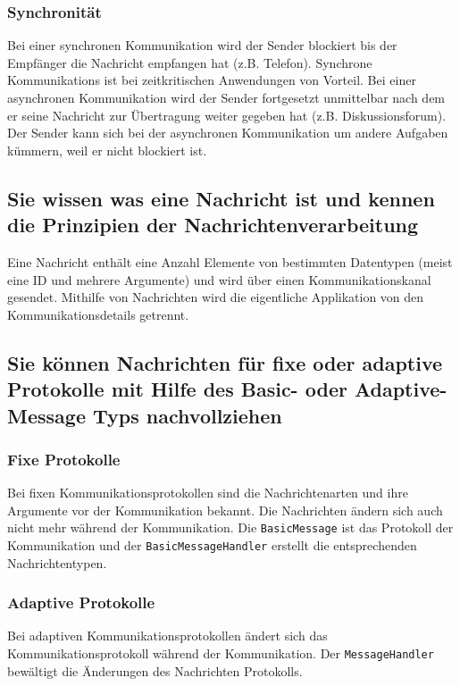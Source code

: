 \subsubsection{Synchronität}

Bei einer synchronen Kommunikation wird der Sender blockiert bis der Empfänger die Nachricht empfangen hat (z.B. Telefon). Synchrone Kommunikations ist bei zeitkritischen Anwendungen von Vorteil. Bei einer asynchronen Kommunikation wird der Sender fortgesetzt unmittelbar nach dem er seine Nachricht zur Übertragung weiter gegeben hat (z.B. Diskussionsforum). Der Sender kann sich bei der asynchronen Kommunikation um andere Aufgaben kümmern, weil er nicht blockiert ist.

\subsection{Sie wissen was eine Nachricht ist und kennen die Prinzipien der Nachrichtenverarbeitung}

Eine Nachricht enthält eine Anzahl Elemente von bestimmten Datentypen (meist eine ID und mehrere Argumente) und wird über einen Kommunikationskanal gesendet. Mithilfe von Nachrichten wird die eigentliche Applikation von den Kommunikationsdetails getrennt.

\subsection{Sie können Nachrichten für fixe oder adaptive Protokolle mit Hilfe des Basic- oder Adaptive-Message Typs nachvollziehen}

\subsubsection{Fixe Protokolle}

Bei fixen Kommunikationsprotokollen sind die Nachrichtenarten und ihre Argumente vor der Kommunikation bekannt. Die Nachrichten ändern sich auch nicht mehr während der Kommunikation. Die \texttt{BasicMessage} ist das Protokoll der Kommunikation und der \texttt{BasicMessageHandler} erstellt die entsprechenden Nachrichtentypen.

\subsubsection{Adaptive Protokolle}

Bei adaptiven Kommunikationsprotokollen ändert sich das Kommunikationsprotokoll während der Kommunikation. Der \texttt{MessageHandler} bewältigt die Änderungen des Nachrichten Protokolls.

